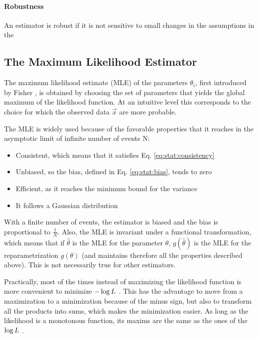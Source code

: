 
\paragraph{Robustness}
An estimator is robust if it is not sensitive to small changes in the assumptions in the \pdf


\subsection{The Maximum Likelihood Estimator}

The maximum likelihood estimate (MLE) of the parameters $\theta_i$, first introduced by Fisher \cite{fisher1911absolute}\cite{aldrich1997}, is obtained by choosing the set of parameters that yields the global maximum of the likelihood function. At an intuitive level this corresponds to the choice for which the observed data $\vec{x}$ are more probable. 

The MLE is widely used because of the favorable properties that it reaches in the asymptotic limit of infinite number of events N:
\begin{itemize}
\item Consistent, which means that it satisfies Eq. \ref{eq:stat:consistency}
\item Unbiased, so the bias, defined in Eq. \ref{eq:stat:bias}, tends to zero
\item Efficient, as it reaches the minimum bound for the variance 
\item It follows a Gaussian distribution
\end{itemize}
With a finite number of events, the estimator is biased and the bias is proportional to $\frac{1}{N}$. Also, the MLE is invariant under a functional transformation, which means that if $\hat{\theta}$ is the MLE for the parameter $\theta$, $g(\hat{\theta})$ is the MLE for the reparametrization $g(\theta)$ (and maintains therefore all the properties described above). This is not necessarily true for other estimators.

Practically, most of the times instead of maximizing the likelihood function is more convenient to minimize $-\log{L} \ $. This has the advantage to move from a maximization to a minimization because of the minus sign, but also to transform all the products into sums, which makes the minimization easier. As long as the likelihood is a monotonous function, its maxims are the same as the ones of the $\log{L} \ $.

